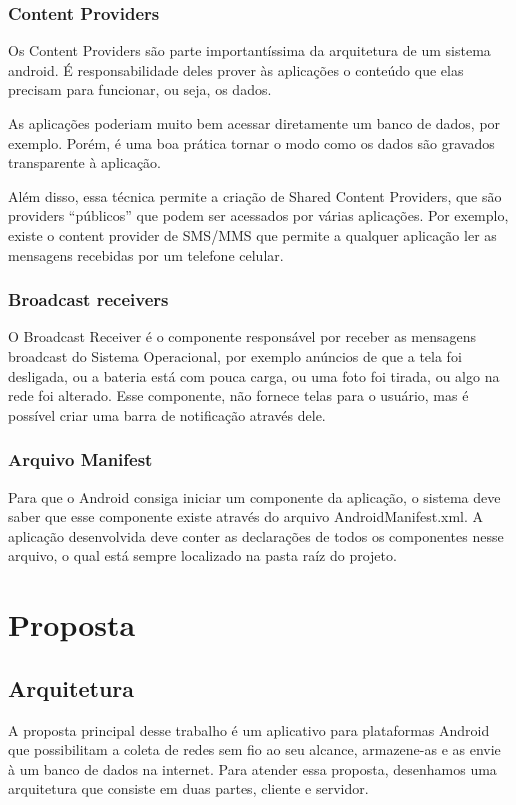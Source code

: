 \documentclass[12pt, %
openright, 
oneside,
a4paper,
brazil]{facom-ufu-abntex2}
\begin{document}
	\subsection{Content Providers}
	Os Content Providers são parte importantíssima da arquitetura de um sistema android. É responsabilidade deles prover às aplicações o conteúdo que elas precisam para funcionar, ou seja, os dados.

As aplicações poderiam muito bem acessar diretamente um banco de dados, por exemplo. Porém, é uma boa prática tornar o modo como os dados são gravados transparente à aplicação. 

Além disso, essa técnica permite a criação de Shared Content Providers, que são providers “públicos” que podem ser acessados por várias aplicações. Por exemplo, existe o content provider de SMS/MMS que permite a qualquer aplicação ler as mensagens recebidas por um telefone celular.

	\subsection{Broadcast receivers}
	O Broadcast Receiver é o componente responsável por receber as mensagens broadcast do Sistema Operacional, por exemplo anúncios de que a tela foi desligada, ou a bateria está com pouca carga, ou uma foto foi tirada, ou algo na rede foi alterado. Esse componente, não fornece telas para o usuário, mas é possível criar uma barra de notificação através dele.

	\subsection{Arquivo Manifest}
	Para que o Android consiga iniciar um componente da aplicação, o sistema deve saber que esse componente existe através do arquivo AndroidManifest.xml. A aplicação desenvolvida deve conter as declarações de todos os componentes nesse arquivo, o qual está sempre localizado na pasta raíz do projeto.		


\chapter{Proposta}


\section{Arquitetura}
A proposta principal desse trabalho é um aplicativo para plataformas Android que possibilitam  a coleta de redes sem fio   ao seu alcance, armazene-as e as envie à um banco de dados na internet. Para atender essa proposta, desenhamos uma arquitetura que consiste em duas partes, cliente e servidor.
\end{document}
